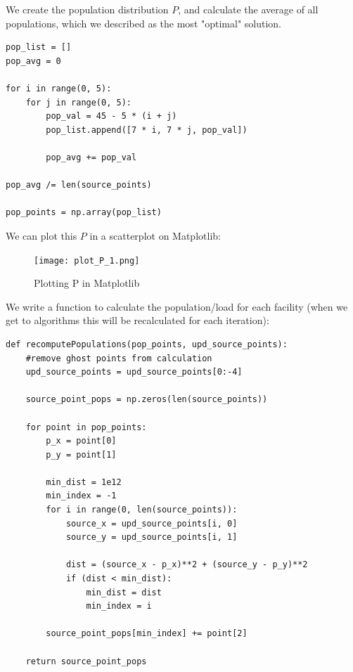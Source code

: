 \documentclass{article}
\begin{document}
We create the population distribution $P$, and calculate the average of all populations, which we described as the most "optimal" solution.

\begin{verbatim} 
pop_list = []
pop_avg = 0

for i in range(0, 5):
    for j in range(0, 5):
        pop_val = 45 - 5 * (i + j)
        pop_list.append([7 * i, 7 * j, pop_val])
        
        pop_avg += pop_val

pop_avg /= len(source_points)

pop_points = np.array(pop_list)
\end{verbatim}

We can plot this $P$ in a scatterplot on Matplotlib:

\begin{figure}[H]
    \centering
    \captionsetup{justification=centering}
    \texttt{[image: plot\_P\_1.png]}
    \caption{Plotting P in Matplotlib}
    \label{fig:mid-interface}
\end{figure}

We write a function to calculate the population/load for each facility (when we get to algorithms this will be recalculated for each iteration):

\begin{verbatim} 
def recomputePopulations(pop_points, upd_source_points):
    #remove ghost points from calculation
    upd_source_points = upd_source_points[0:-4]
    
    source_point_pops = np.zeros(len(source_points))
    
    for point in pop_points:
        p_x = point[0]
        p_y = point[1]
        
        min_dist = 1e12
        min_index = -1
        for i in range(0, len(source_points)):
            source_x = upd_source_points[i, 0]
            source_y = upd_source_points[i, 1]
        
            dist = (source_x - p_x)**2 + (source_y - p_y)**2
            if (dist < min_dist):
                min_dist = dist
                min_index = i

        source_point_pops[min_index] += point[2]
    
    return source_point_pops
\end{verbatim}
\end{document}
